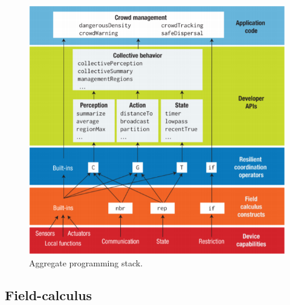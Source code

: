 \begin{figure}[h]
    \centering
    \includegraphics{figures/ACstack.png}
    \caption[Aggregate programming stack]{Aggregate programming stack.~\cite{BealIEEEComputer2015}}
    \label{fig:ACstack}
\end{figure}

\subsection{Field-calculus}

